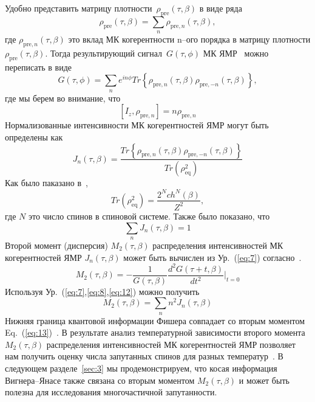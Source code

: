 \documentclass[preprint,12pt]{elsarticle}
\begin{document}
Удобно представить матрицу плотности~$\rho_\mathrm{pre}(\tau, \beta)$ в виде ряда~\cite{21}
\begin{equation}
    \label{eq:6}
        \rho_\mathrm{pre}(\tau,\beta) = \sum_n \rho_{\mathrm{pre},n}(\tau,\beta),
\end{equation}
где $\rho_{\mathrm{pre}, n}(\tau,\beta)$ это вклад МК когерентности n--ого порядка в матрицу плотности $\rho_\mathrm{pre}(\tau,\beta)$.  
Тогда результирующий сигнал~$G(\tau,\phi)$ МК ЯМР~\cite{10} можно переписать в виде 
\begin{equation} \label{eq:7}
    G(\tau, \phi) = \sum_n e^{in\phi}
        Tr\left\{\rho_{\mathrm{pre},n}(\tau,\beta)
        \rho_{\mathrm{pre},-n}(\tau,\beta) \right\},
\end{equation}
где мы берем во внимание, что 
\begin{equation}
    \label{eq:8}
        [I_z, \rho_{\mathrm{pre},n}] = n \rho_{\mathrm{pre},n}
\end{equation}
Нормализованные интенсивности МК когерентностей ЯМР могут быть определены как
\begin{equation}
    \label{eq:9}
        J_n(\tau,\beta)= \frac{Tr\left\{\rho_{\mathrm{pre},n}(\tau,\beta)
            \rho_{\mathrm{pre},-n}(\tau,\beta)\right\}}
                {Tr(\rho^2_\mathrm{eq})}
\end{equation}
Как было паказано в~\cite{8},
\begin{equation}
    \label{eq:10}
        Tr(\rho_\mathrm{eq}^2) = \frac{2^N ch^N (\beta)}{Z^2},
\end{equation}
где $N$ это число спинов в спиновой системе. 
Также было показано, что 
\begin{equation}
    \label{eq:11}
        \sum_n J_n(\tau,\beta) = 1
\end{equation}
Второй момент (дисперсия) $M_2(\tau,\beta)$ распределения интенсивностей МК когерентностей ЯМР  $J_n (\tau,\beta)$ может быть вычислен из Ур.~(\ref{eq:7}) согласно~\cite{22}.  
\begin{equation}
    \label{eq:12}
        M_2(\tau,\beta) = -\frac{1}{G(\tau, \beta)}
            \frac{d^2 G(\tau + t,\beta)}{dt^2}\bigg|
        _{t=0}
\end{equation}
Используя Ур.~(\ref{eq:7},\ref{eq:8},\ref{eq:12}) можно получить
\begin{equation}
    \label{eq:13}
        M_2 (\tau,\beta) = \sum_n n^2 J_n(\tau,\beta)
\end{equation}
Нижняя граница квантовой информации Фишера совпадает со вторым моментом Eq.~(\ref{eq:13})~\cite{7,9}.
В результате анализ температурной зависимости второго момента $M_2(\tau,\beta)$ распределения интенсивностей МК когерентностей ЯМР позволяет нам получить оценку числа запутанных спинов для разных температур~\cite{8}.
В следующем разделе~\ref{sec:3} мы продемонстрируем, что косая информация Вигнера--Янасе
также связана со вторым моментом $M_2(\tau,\beta)$ 
и может быть полезна для исследования многочастичной запутанности. 
\end{document}
